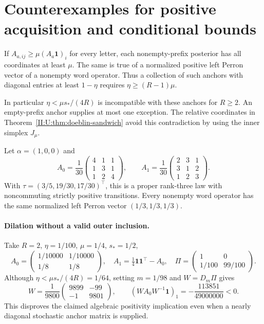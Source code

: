 \section{Counterexamples for positive acquisition and conditional bounds}

\begin{proposition}
\label{II:U:prop:doeblin-purity-obstruction}
If $A_{a,ij}\ge\mu(A_a\mathbf1)_i$ for every letter, each
nonempty-prefix posterior has all coordinates at least $\mu$.
The same is true of a normalized positive left Perron vector of a
nonempty word operator. Thus a collection of such anchors with
diagonal entries at least $1-\eta$ requires $\eta\ge(R-1)\mu$.
\end{proposition}

In particular $\eta<\mu s_*/(4R)$ is incompatible with these anchors
for $R\ge2$. An empty-prefix anchor supplies at most one exception.
The relative coordinates in Theorem~\ref{II:U:thm:doeblin-sandwich} avoid
this contradiction by using the inner simplex $J_\mu$.

\begin{proposition}
\label{II:U:prop:common-perron}
Let $\alpha=(1,0,0)$ and
\[
 A_0=\frac1{30}\begin{pmatrix}4&1&1\\1&3&1\\1&2&4\end{pmatrix},
 \qquad
 A_1=\frac1{30}\begin{pmatrix}2&3&1\\3&1&2\\1&2&3\end{pmatrix}.
\]
With $\tau=(3/5,19/30,17/30)^\top$, this is a proper rank-three
law with noncommuting strictly positive transitions. Every nonempty
word operator has the same normalized left Perron vector
$(1/3,1/3,1/3)$.
\end{proposition}


\paragraph{Dilation without a valid outer inclusion.}
Take $R=2$, $\eta=1/100$, $\mu=1/4$, $s_*=1/2$,
\[
 A_0=\begin{pmatrix}1/10000&1/10000\\1/8&1/8\end{pmatrix},\quad
 A_1=\tfrac14\mathbf1\mathbf1^\top-A_0,\quad
 \Pi=\begin{pmatrix}1&0\\1/100&99/100\end{pmatrix}.
\]
Although $\eta<\mu s_*/(4R)=1/64$, setting $m=1/98$ and
$W=D_m\Pi$ gives
\[
 W=\frac1{9800}\begin{pmatrix}9899&-99\\-1&9801\end{pmatrix},
 \qquad (WA_0W^{-1}\mathbf1)_1=-\frac{113851}{49000000}<0.
\]
This disproves the claimed algebraic positivity implication even
when a nearly diagonal stochastic anchor matrix is supplied.

